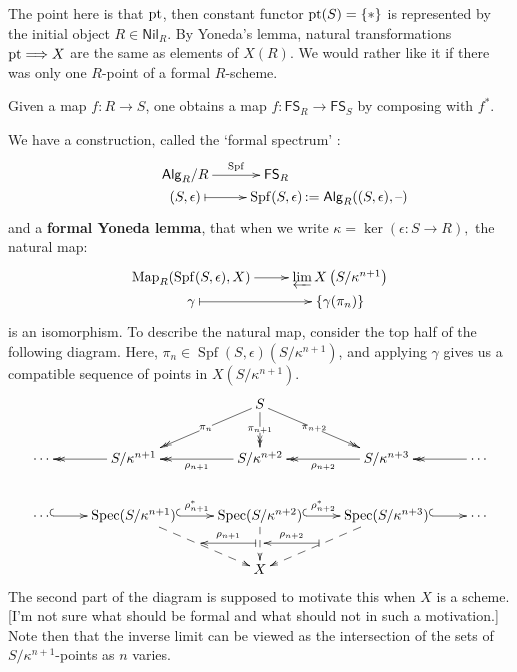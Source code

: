 \documentclass[11pt]{article}
\newcommand{\RAlg}{\mathsf{Alg}_R}
\newcommand{\RNil}{\mathsf{Nil}_R}
\newcommand{\FSR}{\mathsf{FS}_R}
\newcommand{\FSS}{\mathsf{FS}_S}
\DeclareMathOperator{\SPf}{Spf}
\begin{document}
\begin{itemise}
The point here is that $\textup{pt}$, then constant functor $\textup{pt}(S)=\{*\}$ is represented by the initial object $R\in\RNil$. By Yoneda's lemma, natural transformations $\textup{pt}\Longrightarrow X$ are the same as elements of $X(R)$. We would rather like it if there was only one $R$-point of a formal $R$-scheme.
\item Given a map $f:R\to S$, one obtains a map $f:\FSR\to\FSS$ by composing with $f^*$.
\item We have a construction, called the `formal spectrum' :
\[\xymatrix@R=0mm{
\ar[r]^-{\SPf}%
\RAlg/R&%
\FSR\\%
(S,\epsilon)%
\ar@{|->}[r]&
\SPf(S,\epsilon)\makebox[0cm][l]{\,$:=\RAlg((S,\epsilon),\DASH )$}%
}\qquad \qquad \]
and a \textbf{formal Yoneda lemma}, that when we write $\kappa=\ker (\epsilon:S\to R),$ the natural map:
\[\xymatrix@R=0mm{
\ar[r]^-{}%
\Map_R(\SPf(S,\epsilon),X)&%
\varprojlim X\left(S/\kappa^{n+1}\right)\\%
\gamma%
\ar@{|->}[r]&
\{\gamma(\pi_n)\}%
}\]
is an isomorphism. 
To describe the natural map, consider the top half of the following diagram. Here, $\pi_n\in\SPf(S,\epsilon)(S/\kappa^{n+1})$, and applying $\gamma$ gives us a compatible sequence of points in $X(S/\kappa^{n+1})$.
\[\xymatrix{
&%
&%
S
\ar@{->>}[d]|-{\pi_{n+1}}
\ar@{->>}[dl]|-{\pi_{n}}
\ar@{->>}[dr]|-{\pi_{n+2}}
&%
&%
\\%
\cdots 
&%
S/\kappa^{n+1}
\ar@{->>}[l]
&%
S/\kappa^{n+2}
\ar@{->>}[l]^-{\rho_{n+1}}
&%
S/\kappa^{n+3}
\ar@{->>}[l]^-{\rho_{n+2}}
&%
\cdots 
\ar@{->>}[l]
\\%
\cdots 
&%
\Spec(S/\kappa^{n+1})
\ar@{^{(}->}[l];[]
\ar@{-->}[dr]^{}="1"_{}="2"
&%
\Spec(S/\kappa^{n+2})
\ar@{^{(}->}[l];[]^-{\rho_{n+1}^*}
\ar@{-->}[d]^{}="3"_{}="4"
&%
\Spec(S/\kappa^{n+3})
\ar@{^{(}->}[l];[]^-{\rho_{n+2}^*}
\ar@{-->}[dl]^{}="5"_{}="6"
&%
\cdots 
\ar@{^{(}->}[l];[]
\\
&&X
\ar@{|->}"3";"2"_-{\rho_{n+1}}
\ar@{|->}"5";"4"_-{\rho_{n+2}}
}\]
\noindent The second part of the diagram is supposed to motivate this when $X$ is a scheme. [I'm not sure what should be formal and what should not in such a motivation.] Note then that the inverse limit can be viewed as the intersection of the sets of $S/\kappa^{n+1}$-points as $n$ varies.


\end{itemise}
\end{document}
